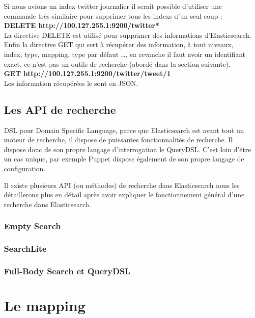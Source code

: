 Si nous avions un index twitter journalier il serait possible d'utiliser une commande
très similaire pour supprimer tous les indexs d'un seul coup :\\

\textbf{DELETE  {\color{grey} http://100.127.255.1:9200}/{\color{red}twitter*}}\\

La directive DELETE est utilisé pour supprimer des informations d'Elasticsearch.\\


Enfin la directive GET qui sert à récupérer des information, à tout niveaux, index,
type, mapping, type par défaut \ldots, en revanche il faut avoir un identifiant exact,
ce n'est pas un outils de recherche (abordé dans la section suivante).\\[5mm]
\textbf{GET  {\color{grey} http://100.127.255.1:9200}/{\color{red}twitter}/{\color{cyan}tweet}/{\color{yellow}1}}\\

Les information récupérées le sont en JSON.

\subsection{Les API de recherche}
DSL pour Domain Specific Language, parce que Elasticsearch est avant tout un moteur 
de recherche, il dispose de puissantes fonctionnalités de recherche. Il dispose donc
de son propre langage d'interrogation le QueryDSL. C'est loin d'être un cas unique,
par exemple Puppet dispose également de son propre langage de configuration.

Il existe plusieurs API (ou méthodes) de recherche dans Elasticsearch nous les  
détaillerons plus en détail après avoir expliquer le fonctionnement général d'une
recherche dans Elasticsearch.



\subsubsection{Empty Search}

\subsubsection{SearchLite}

\subsubsection{Full-Body Search et QueryDSL}

\section{Le mapping}
